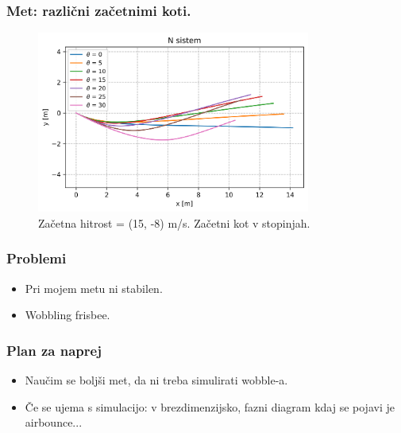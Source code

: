 \documentclass{beamer}
\begin{document}

\begin{frame}
\frametitle{Met: različni začetnimi koti.}

\begin{figure}[H]
	\centering
	  \includegraphics[width=9cm]{med_razlicni_koti.png}
	  \caption{Začetna hitrost = (15, -8) m/s. Začetni kot v stopinjah.}
\end{figure}
\end{frame}


\begin{frame}
\frametitle{Problemi}
\begin{itemize}
\item Pri mojem metu ni stabilen.
\item Wobbling frisbee.
\end{itemize}
\end{frame}

\begin{frame}
\frametitle{Plan za naprej}
\begin{itemize}
\item Naučim se boljši met, da ni treba simulirati wobble-a.
\item Če se ujema s simulacijo: v brezdimenzijsko, fazni diagram kdaj se pojavi je airbounce...
\end{itemize}
\end{frame}

\end{document}
